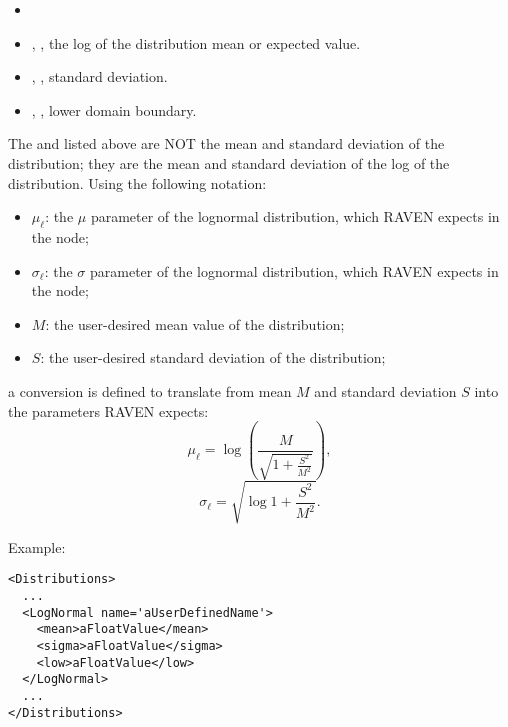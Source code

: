 %
\attrIntro
\vspace{-5mm}
\begin{itemize}
  \itemsep0em
  \item \nameDescription
\end{itemize}
\vspace{-5mm}
\subnodesIntro
\begin{itemize}
  \item {}, , the log of the distribution
  mean or expected value.
  \item {}, , standard
  deviation.
  \item {}, , lower domain
  boundary. 
\end{itemize}
\nb The  and  listed above are NOT the mean and standard deviation of the
distribution; they are the mean and standard deviation of the log of the distribution.  Using the following
notation:
\begin{itemize}
  \item $\mu_\ell$: the $\mu$ parameter of the lognormal distribution, which RAVEN expects in the
     node;
  \item $\sigma_\ell$: the $\sigma$ parameter of the lognormal distribution, which RAVEN expects in the
     node;
  \item $M$: the user-desired mean value of the distribution;
  \item $S$: the user-desired standard deviation of the distribution;
\end{itemize}
a conversion is defined to translate from mean $M$ and standard deviation $S$ into the parameters RAVEN
expects:
\begin{equation}
  \mu_\ell = \log\left(\frac{M}{\sqrt{1+\frac{S^2}{M^2}}}\right),
\end{equation}
\begin{equation}
  \sigma_\ell = \sqrt{\log{1+\frac{S^2}{M^2} }}.
\end{equation}

Example:
\begin{lstlisting}[style=XML]
<Distributions>
  ...
  <LogNormal name='aUserDefinedName'>
    <mean>aFloatValue</mean>
    <sigma>aFloatValue</sigma>
    <low>aFloatValue</low>
  </LogNormal>
  ...
</Distributions>
\end{lstlisting}

